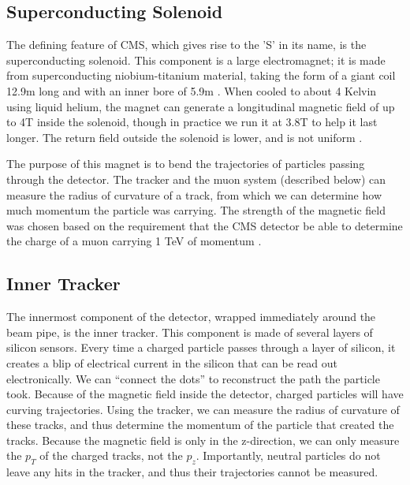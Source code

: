 


\subsection{Superconducting Solenoid}
\label{ssec:cms:components:magnet}

The defining feature of CMS, which gives rise to the 'S' in its name,
is the superconducting solenoid. This component is a large
electromagnet; it is made from superconducting niobium-titanium
material, taking the form of a giant coil 12.9m long and with an inner
bore of 5.9m \cite{tdr}. When cooled to about 4 Kelvin using liquid helium,
the magnet can generate a longitudinal magnetic
field of up to 4T inside the solenoid, though in practice we run it at
3.8T to help it last longer. The return field outside the
solenoid is lower, and is not uniform \cite{accelexper}.

The purpose of this magnet is to bend the trajectories of particles
passing through the detector. The tracker and the muon system
(described below) can measure the radius of curvature of a track, from
which we can determine how much momentum the particle was
carrying. The strength of the magnetic field was chosen based on
the requirement that the CMS detector be able to determine the charge
of a muon carrying 1 TeV of momentum \cite{tdr}.

\subsection{Inner Tracker}
\label{ssec:cms:components:tracker}

The innermost component of the detector, wrapped immediately around
the beam pipe, is the inner tracker. This component is made of several
layers of silicon sensors. Every time a charged
particle passes through a layer of silicon, it creates a blip of
electrical current in the silicon that can be read out
electronically. We can ``connect the dots'' to reconstruct the path
the particle took. Because of the magnetic field inside the detector,
charged particles will have curving trajectories. Using the tracker,
we can measure the radius of curvature of these tracks, and thus
determine the momentum of the particle that created the
tracks. Because the magnetic field is only in the z-direction, we can
only measure the $p_T$ of the charged tracks, not the
$p_z$. Importantly, neutral particles do not leave any hits in the
tracker, and thus their trajectories cannot be measured.

